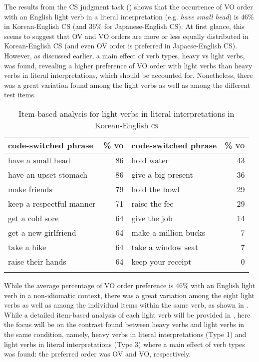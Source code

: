The results from the \ac{CS} judgment task () shows that the occurrence of \ac{VO} order with an English light verb in a literal interpretation (e.g. \textit{have small head}) is 46\% in Korean-English \ac{CS} (and 36\% for Japanese-English \ac{CS}). At first glance, this seems to suggest that \ac{OV} and \ac{VO} orders are more or less equally distributed in Korean-English \ac{CS} (and even \ac{OV} order is preferred in Japaese-English \ac{CS}). However, as discussed earlier, a main effect of verb types, heavy vs light verbs, was found, revealing a higher preference of \ac{VO} order with light verbs than heavy verbs in literal interpretations, which should be accounted for. Nonetheless, there was a great variation found among the light verbs as well as among the different test items.

\begin{table}[b]
\caption{Item-based analysis for light verbs in literal interpretations in Korean-English \textsc{cs}}
\label{tab:5.2}
 \begin{tabularx}{\textwidth}{XrXr}
  \lsptoprule
   code-switched phrase & \% \textsc{vo} & code-switched phrase & \% \textsc{vo} \\
  \midrule
  have a small head & 86&               hold water & 43\\
have an upset stomach & 86&             give a big present & 36\\
make friends & 79&                      hold the bowl & 29\\
keep a respectful manner & 71&          raise the fee & 29\\
get a cold sore & 64&                   give the job & 14\\
get a new girlfriend & 64&              make a million bucks & 7\\
take a hike & 64&                       take a window seat & 7\\
raise their hands & 64&                 keep your receipt & 0\\
   \lspbottomrule
 \end{tabularx}
\end{table}

While the average percentage of \ac{VO} order preference is 46\% with an English light verb in a non-idiomatic context, there was a great variation among the eight light verbs as well as among the individual items within the same verb, as shown in . While a detailed item-based analysis of each light verb will be provided in , here the focus will be on the contrast found between heavy verbs and light verbs in the same condition, namely, heavy verbs in literal interpretations (Type 1) and light verbs in literal interpretations (Type 3) where a main effect of verb types was found: the preferred order was \ac{OV} and \ac{VO}, respectively. 

